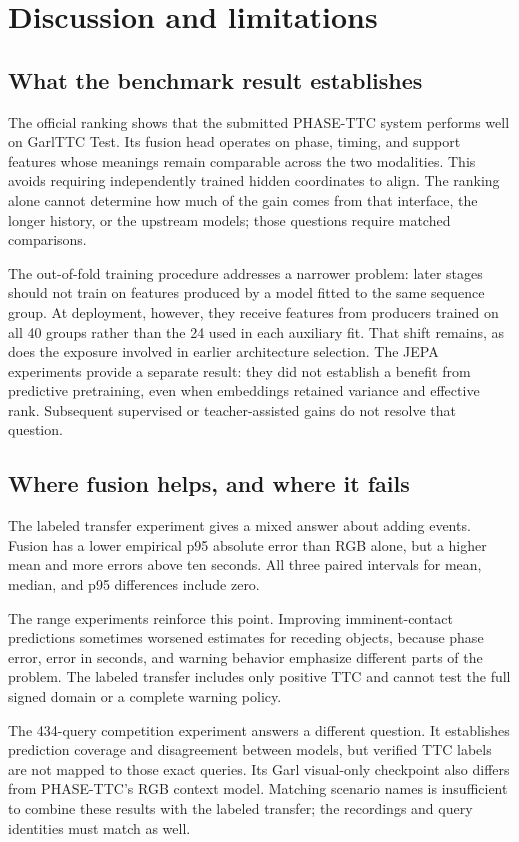\section{Discussion and limitations}
\subsection{What the benchmark result establishes}
The official ranking shows that the submitted PHASE-TTC system performs well on GarlTTC Test. Its fusion head operates on phase, timing, and support features whose meanings remain comparable across the two modalities. This avoids requiring independently trained hidden coordinates to align. The ranking alone cannot determine how much of the gain comes from that interface, the longer history, or the upstream models; those questions require matched comparisons. 

The out-of-fold training procedure addresses a narrower problem: later stages should not train on features produced by a model fitted to the same sequence group. At deployment, however, they receive features from producers trained on all 40 groups rather than the 24 used in each auxiliary fit. That shift remains, as does the exposure involved in earlier architecture selection. The JEPA experiments provide a separate result: they did not establish a benefit from predictive pretraining, even when embeddings retained variance and effective rank. Subsequent supervised or teacher-assisted gains do not resolve that question.

\subsection{Where fusion helps, and where it fails}
The labeled transfer experiment gives a mixed answer about adding events. Fusion has a lower empirical p95 absolute error than RGB alone, but a higher mean and more errors above ten seconds. All three paired intervals for mean, median, and p95 differences include zero. 

The range experiments reinforce this point. Improving imminent-contact predictions sometimes worsened estimates for receding objects, because phase error, error in seconds, and warning behavior emphasize different parts of the problem. The labeled transfer includes only positive TTC and cannot test the full signed domain or a complete warning policy.

The 434-query competition experiment answers a different question. It establishes prediction coverage and disagreement between models, but verified TTC labels are not mapped to those exact queries. Its Garl visual-only checkpoint also differs from PHASE-TTC's RGB context model. Matching scenario names is insufficient to combine these results with the labeled transfer; the recordings and query identities must match as well. 

